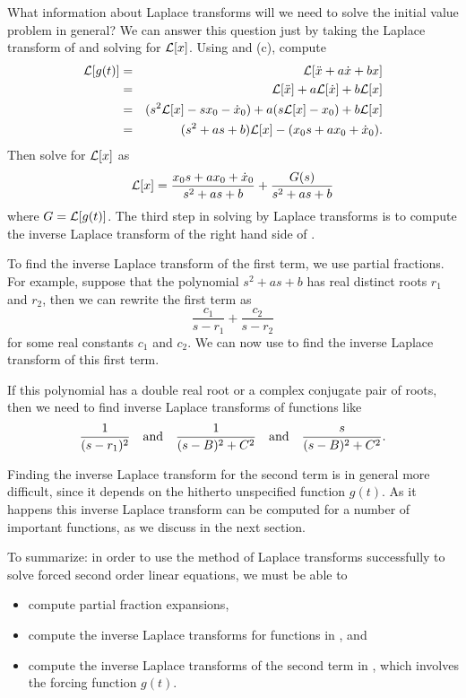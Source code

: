 What information about Laplace transforms will we need to solve the 
initial value problem  in general?  We can answer this 
question just by taking the Laplace transform of  and 
solving for ${\cal L}[x]$.  Using  and (c), 
compute 
\begin{eqnarray*}
{\cal L}[g(t)] & = & {\cal L}[\ddot{x}+a\dot{x} + bx] \\
& = & {\cal L}[\ddot{x}] + a{\cal L}[\dot{x}]+b {\cal L}[x] \\ 
& = & (s^2{\cal L}[x]-sx_0-\dot{x}_0) +a(s{\cal L}[x]-x_0)+b{\cal L}[x]\\
& = & (s^2+as+b){\cal L}[x]-(x_0s+ax_0+\dot{x}_0).
\end{eqnarray*}
Then solve for ${\cal L}[x]$ as
\begin{equation}  \label{e:laplace2nd}
{\cal L}[x] = \frac{x_0s + ax_0+\dot{x}_0}{s^2+as+b} + \frac{G(s)}{s^2+as+b}
\end{equation}
where $G = {\cal L}[g(t)]$.  The third step in solving 
by Laplace transforms is to compute the inverse Laplace transform
 of the right hand side of 
.  

To find the inverse Laplace transform of the first term, we use partial 
fractions.  For example, suppose that the polynomial $s^2+as+b$ 
has real distinct roots $r_1$ and $r_2$, then we can rewrite the first 
term as 
\[
\frac{c_1}{s-r_1} + \frac{c_2}{s-r_2}
\]
for some real constants $c_1$ and $c_2$.  We can now use 
to find the inverse Laplace transform of this first term.  

If this polynomial has a double real root or a complex conjugate pair of 
roots, then we need to find inverse Laplace transforms of functions like
\begin{equation}  \label{e:sampleLT}
\frac{1}{(s-r_1)^2}  \quad\mbox{and}\quad \frac{1}{(s-B)^2+C^2} \quad\mbox{and}\quad \frac{s}{(s-B)^2+C^2}.
\end{equation}

Finding the inverse Laplace transform for the second term is in general 
more difficult, since it depends on the hitherto unspecified function $g(t)$.
As it happens this inverse Laplace transform can be computed for a number 
of important functions, as we discuss in the next section.

To summarize: in order to use the method of Laplace transforms successfully
to solve forced second order linear equations, we must be able to
\begin{itemize}
\item	compute partial fraction expansions,
\item	compute the inverse Laplace transforms
 for functions in , and
\item   compute the inverse Laplace transforms of the second term in 
, which involves the forcing function $g(t)$.
\end{itemize}


